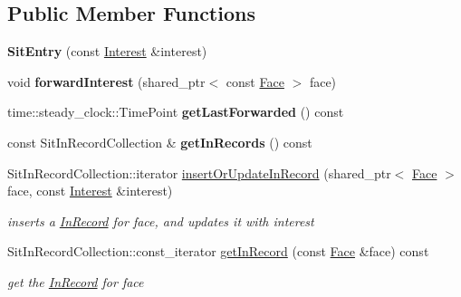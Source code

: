 \subsection*{Public Member Functions}
\begin{DoxyCompactItemize}
\item 
{\bfseries Sit\+Entry} (const \hyperlink{classndn_1_1Interest}{Interest} \&interest)\hypertarget{classnfd_1_1pit_1_1SitEntry_a51421758f91dec6efea3b32134206382}{}\label{classnfd_1_1pit_1_1SitEntry_a51421758f91dec6efea3b32134206382}

\item 
void {\bfseries forward\+Interest} (shared\+\_\+ptr$<$ const \hyperlink{classnfd_1_1Face}{Face} $>$ face)\hypertarget{classnfd_1_1pit_1_1SitEntry_a62b571e8abec9ed3afc1938151ab0ec2}{}\label{classnfd_1_1pit_1_1SitEntry_a62b571e8abec9ed3afc1938151ab0ec2}

\item 
time\+::steady\+\_\+clock\+::\+Time\+Point {\bfseries get\+Last\+Forwarded} () const\hypertarget{classnfd_1_1pit_1_1SitEntry_af5d6883995bb9f368a3db6ccea7a347e}{}\label{classnfd_1_1pit_1_1SitEntry_af5d6883995bb9f368a3db6ccea7a347e}

\item 
const Sit\+In\+Record\+Collection \& {\bfseries get\+In\+Records} () const\hypertarget{classnfd_1_1pit_1_1SitEntry_a830b15f7da3a989b4ea62ed18850e6c4}{}\label{classnfd_1_1pit_1_1SitEntry_a830b15f7da3a989b4ea62ed18850e6c4}

\item 
Sit\+In\+Record\+Collection\+::iterator \hyperlink{classnfd_1_1pit_1_1SitEntry_a40e84adf9b5fa79ebb3d05dc60b22dc8}{insert\+Or\+Update\+In\+Record} (shared\+\_\+ptr$<$ \hyperlink{classnfd_1_1Face}{Face} $>$ face, const \hyperlink{classndn_1_1Interest}{Interest} \&interest)
\begin{DoxyCompactList}\small\item\em inserts a \hyperlink{classnfd_1_1pit_1_1InRecord}{In\+Record} for face, and updates it with interest \end{DoxyCompactList}\item 
Sit\+In\+Record\+Collection\+::const\+\_\+iterator \hyperlink{classnfd_1_1pit_1_1SitEntry_adc4e8f648650e5125c3a72704d544ee0}{get\+In\+Record} (const \hyperlink{classnfd_1_1Face}{Face} \&face) const
\begin{DoxyCompactList}\small\item\em get the \hyperlink{classnfd_1_1pit_1_1InRecord}{In\+Record} for face \end{DoxyCompactList}\end{DoxyCompactItemize}
